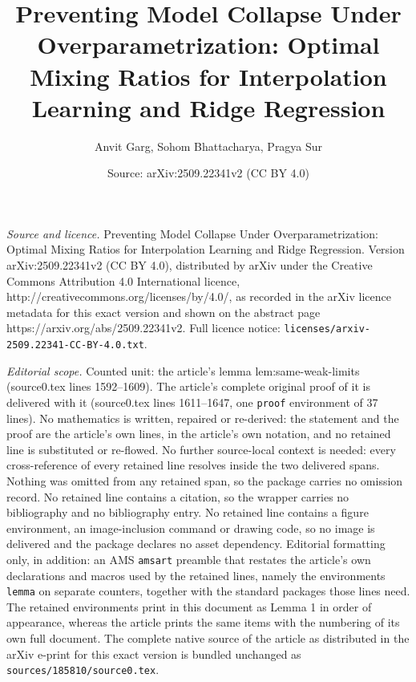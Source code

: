 \documentclass[10pt,a4paper]{amsart}
\title{Preventing Model Collapse Under Overparametrization: Optimal Mixing Ratios for Interpolation Learning and Ridge Regression}
\author{Anvit Garg, Sohom Bhattacharya, Pragya Sur}
\date{Source: arXiv:2509.22341v2 (CC BY 4.0)}
\begin{document}
\maketitle

\noindent\emph{Source and licence.} Preventing Model Collapse Under Overparametrization: Optimal Mixing Ratios for Interpolation Learning and Ridge Regression. Version arXiv:2509.22341v2 (CC BY 4.0), distributed by arXiv under the Creative Commons Attribution 4.0 International licence, http://creativecommons.org/licenses/by/4.0/, as recorded in the arXiv licence metadata for this exact version and shown on the abstract page https://arxiv.org/abs/2509.22341v2. Full licence notice: \texttt{licenses/arxiv-2509.22341-CC-BY-4.0.txt}.\par\smallskip

\noindent\textit{Editorial scope.} Counted unit: the article's lemma lem:same-weak-limits (source0.tex lines 1592--1609). The article's complete original proof of it is delivered with it (source0.tex lines 1611--1647, one \texttt{proof} environment of 37 lines). No mathematics is written, repaired or re-derived: the statement and the proof are the article's own lines, in the article's own notation, and no retained line is substituted or re-flowed.  No further source-local context is needed: every cross-reference of every retained line resolves inside the two delivered spans.  Nothing was omitted from any retained span, so the package carries no omission record.  No retained line contains a citation, so the wrapper carries no bibliography and no bibliography entry.  No retained line contains a figure environment, an image-inclusion command or drawing code, so no image is delivered and the package declares no asset dependency.  Editorial formatting only, in addition: an AMS \texttt{amsart} preamble that restates the article's own declarations and macros used by the retained lines, namely the environments \texttt{lemma} on separate counters, together with the standard packages those lines need.  The retained environments print in this document as Lemma 1 in order of appearance, whereas the article prints the same items with the numbering of its own full document.  The complete native source of the article as distributed in the arXiv e-print for this exact version is bundled unchanged as \texttt{sources/185810/source0.tex}.
\end{document}
